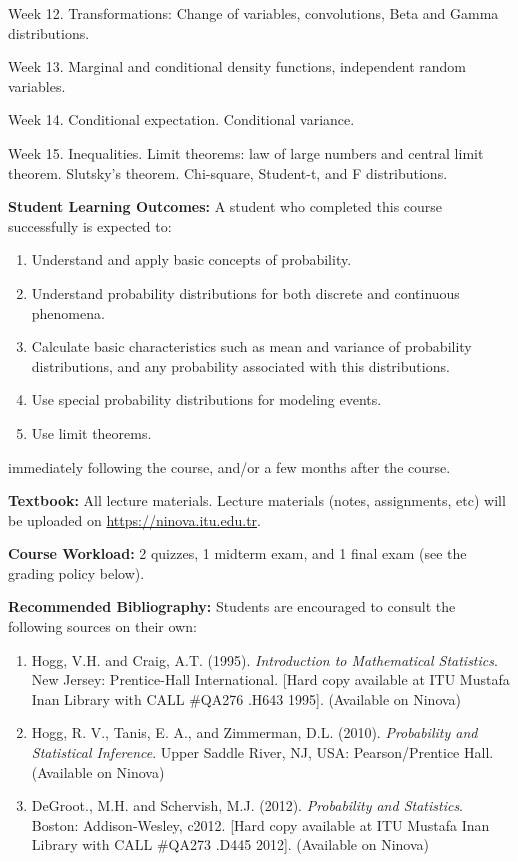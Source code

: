 \documentclass[
  12pt,
]{article}
\providecommand{\tightlist}{%
  \setlength{\itemsep}{0pt}\setlength{\parskip}{0pt}}
\begin{document}
Week 12. Transformations: Change of variables, convolutions, Beta and
Gamma distributions.

Week 13. Marginal and conditional density functions, independent random
variables.

Week 14. Conditional expectation. Conditional variance.

Week 15. Inequalities. Limit theorems: law of large numbers and central
limit theorem. Slutsky's theorem. Chi-square, Student-t, and F
distributions.

\textbf{Student Learning Outcomes:} A student who completed this course
successfully is expected to:

\begin{enumerate}
\def\labelenumi{\arabic{enumi}.}
\tightlist
\item
  Understand and apply basic concepts of probability.
\item
  Understand probability distributions for both discrete and continuous
  phenomena.
\item
  Calculate basic characteristics such as mean and variance of
  probability distributions, and any probability associated with this
  distributions.
\item
  Use special probability distributions for modeling events.
\item
  Use limit theorems.
\end{enumerate}

immediately following the course, and/or a few months after the course.

\textbf{Textbook:} All lecture materials. Lecture materials (notes,
assignments, etc) will be uploaded on
\href{Ninova}{https://ninova.itu.edu.tr}.

\textbf{Course Workload:} 2 quizzes, 1 midterm exam, and 1 final exam
(see the grading policy below).

\textbf{Recommended Bibliography:} Students are encouraged to consult
the following sources on their own:

\begin{enumerate}
\def\labelenumi{\arabic{enumi}.}
\tightlist
\item
  Hogg, V.H. and Craig, A.T. (1995).
  \textit{Introduction to Mathematical Statistics}. New Jersey:
  Prentice-Hall International. {[}Hard copy available at ITU Mustafa
  Inan Library with CALL \#QA276 .H643 1995{]}. (Available on Ninova)
\item
  Hogg, R. V., Tanis, E. A., and Zimmerman, D.L. (2010).
  \textit{Probability and Statistical Inference}. Upper Saddle River,
  NJ, USA: Pearson/Prentice Hall. (Available on Ninova)
\item
  DeGroot., M.H. and Schervish, M.J. (2012).
  \textit{Probability and Statistics}. Boston: Addison-Wesley, c2012.
  {[}Hard copy available at ITU Mustafa Inan Library with CALL \#QA273
  .D445 2012{]}. (Available on Ninova)
\end{enumerate}
\end{document}
